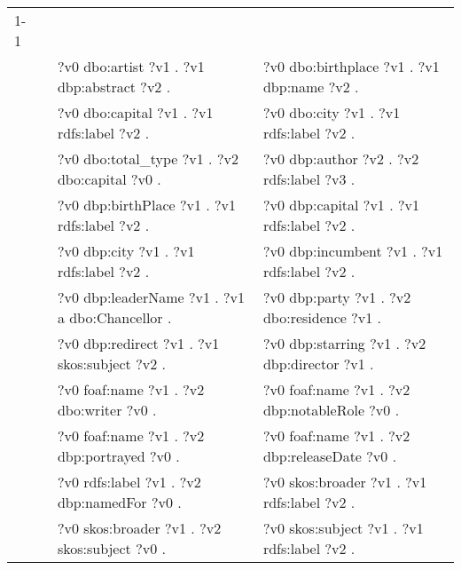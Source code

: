 \begin{table}
{\begin{tabular}{!{\color{white}\vrule}l!{\color{white}\vrule}c@{\hs}!{\color{white}\vrule}p{11.5cm}!{\color{white}\vrule}p{11.5cm}!{\color{white}\vrule}}
			\midrule
			1-1 & \phantom{a} & \\
			 &  \phantom{a} &   ?v0 dbo:artist ?v1 .  ?v1 dbp:abstract ?v2 . &  ?v0 dbo:birthplace ?v1 .  ?v1 dbp:name ?v2 . \\
			 &  \phantom{a} &   ?v0 dbo:capital ?v1 .  ?v1 rdfs:label ?v2 . &  ?v0 dbo:city ?v1 .  ?v1 rdfs:label ?v2 . \\
			 &  \phantom{a} &   ?v0 dbo:total\_type ?v1 .  ?v2 dbo:capital ?v0 . &  ?v0 dbp:author ?v2 .  ?v2 rdfs:label ?v3 . \\
			 &  \phantom{a} &   ?v0 dbp:birthPlace ?v1 .  ?v1 rdfs:label ?v2 . &  ?v0 dbp:capital ?v1 .  ?v1 rdfs:label ?v2 . \\
			 &  \phantom{a} &   ?v0 dbp:city ?v1 .  ?v1 rdfs:label ?v2 . &  ?v0 dbp:incumbent ?v1 .  ?v1 rdfs:label ?v2 . \\
			 &  \phantom{a} &   ?v0 dbp:leaderName ?v1 .  ?v1 a dbo:Chancellor . &  ?v0 dbp:party ?v1 .  ?v2 dbo:residence ?v1 . \\
			 &  \phantom{a} &   ?v0 dbp:redirect ?v1 .  ?v1 skos:subject ?v2 . &  ?v0 dbp:starring ?v1 .  ?v2 dbp:director ?v1 . \\
			 &  \phantom{a} &   ?v0 foaf:name ?v1 .  ?v2 dbo:writer ?v0 . &  ?v0 foaf:name ?v1 .  ?v2 dbp:notableRole ?v0 . \\
			 &  \phantom{a} &   ?v0 foaf:name ?v1 .  ?v2 dbp:portrayed ?v0 . &  ?v0 foaf:name ?v1 .  ?v2 dbp:releaseDate ?v0 . \\
			 &  \phantom{a} &   ?v0 rdfs:label ?v1 .  ?v2 dbp:namedFor ?v0 . &  ?v0 skos:broader ?v1 .  ?v1 rdfs:label ?v2 . \\
			 &  \phantom{a} &   ?v0 skos:broader ?v1 .  ?v2 skos:subject ?v0 . &  ?v0 skos:subject ?v1 .  ?v1 rdfs:label ?v2 . \\
			

\end{tabular}}
\end{table}
